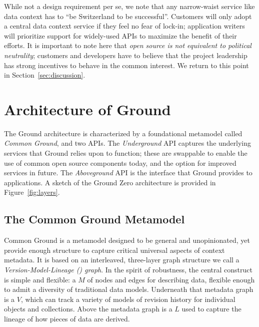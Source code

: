 \documentclass{sig-alternate}
\begin{document}
  While not a design requirement per se, we note that any narrow-waist service like data context has to ``be Switzerland to be successful''.  Customers will only adopt a central data context service if they feel no fear of lock-in; application writers will prioritize support for widely-used APIs to maximize the benefit of their efforts. 
It is important to note here that \emph{open source is not equivalent to political neutrality}; customers and developers have to believe that the project leadership has strong incentives to behave in the common interest. We return to this point in Section~\ref{sec:discussion}.

\vspace{1em}

\section{Architecture of Ground}
\label{sec:arch}
The Ground architecture is characterized by a foundational metamodel called \emph{Common Ground}, and two APIs.  The \emph{Underground} API captures the underlying services that Ground relies upon to function; these are swappable to enable the use of common open source components today, and the option for improved services in future. The \emph{Aboveground} API is the interface that Ground provides to applications.
A sketch of the Ground Zero architecture is provided in Figure~\ref{fig:layers}.


\subsection{The Common Ground Metamodel}
\label{sec:metamodel}
Common Ground is a metamodel designed to be general and unopinionated, yet provide enough structure to capture  critical universal aspects of context metadata.  It is based on an interleaved, three-layer graph structure we call a \emph{Version-Model-Lineage (\vml) graph}.  In the spirit of robustness, the central construct is simple and flexible: a \modelgraph $M$ of nodes and edges for describing data, flexible enough to admit a diversity of traditional data models.
Underneath that metadata graph is a \versiongraph $V$, which can track a variety of models 
of revision history for individual objects and collections. Above the metadata graph is a 
\lineagegraph $L$ used to capture the lineage of how pieces of data are derived.
\end{document}
